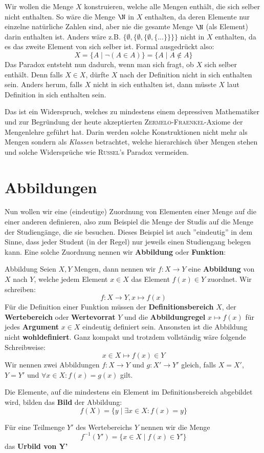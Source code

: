 Wir wollen die Menge $X$ konstruieren, welche alle Mengen enthält, die sich selber nicht enthalten. So wäre die Menge $\N$ in $X$ enthalten, da deren Elemente nur einzelne natürliche Zahlen sind, aber nie die gesamte Menge $\N$ (als Element) darin enthalten ist. Anders wäre z.B. $\{\emptyset, \{\emptyset, \{\emptyset, \{...\}\}\}\}$ nicht in $X$ enthalten, da es das zweite Element von sich selber ist. Formal ausgedrückt also:
$$X = \{ A \mid \neg(A \in A) \} = \{ A \mid A \notin A \}$$
Das Paradox entsteht nun dadurch, wenn man sich fragt, ob $X$ sich selber enthält. Denn falls $X\in X$, dürfte $X$ nach der Definition nicht in sich enthalten sein. Anders herum, falls $X$ nicht in sich enthalten ist, dann müsste $X$ laut Definition in sich enthalten sein.

Das ist ein Widerspruch, welches zu mindestens einem depressiven Mathematiker und zur Begründung der heute akzeptierten \textsc{Zermelo-Fraenkel}-Axiome der Mengenlehre geführt hat. Darin werden solche Konstruktionen nicht mehr als Mengen sondern als \textit{Klassen} betrachtet, welche hierarchisch über Mengen stehen und solche Widersprüche wie \textsc{Russel}'s Paradox vermeiden.

\section{Abbildungen}
Nun wollen wir eine (eindeutige) Zuordnung von Elementen einer Menge auf die einer anderen definieren, also zum Beispiel die Menge der Studis auf die Menge der Studiengänge, die sie besuchen. Dieses Beispiel ist auch ''eindeutig'' in dem Sinne, dass jeder Student (in der Regel) nur jeweils einen Studiengang belegen kann. Eine solche Zuordnung nennen wir \textbf{Abbildung} oder \textbf{Funktion}:

\begin{definition}{Abbildung}{}
Seien $X, Y$ Mengen, dann nennen wir $f: X \to Y$ eine \textbf{Abbildung} von $X$ nach $Y$, welche jedem Element $x \in X$ das Element $f(x) \in Y$ zuordnet. Wir schreiben:
$$f: X\to Y, x\mapsto f(x)$$
Für die Definition einer Funktion müssen der \textbf{Definitionsbereich} $X$, der \textbf{Wertebereich} oder \textbf{Wertevorrat} $Y$ und die \textbf{Abbildungregel} $x \mapsto f(x)$ für jedes \textbf{Argument} $x \in X$ eindeutig definiert sein. Ansonsten ist die Abbildung nicht \textbf{wohldefiniert}. Ganz kompakt und trotzdem vollständig wäre folgende Schreibweise:
$$x \in X \mapsto f(x) \in Y$$
Wir nennen zwei Abbildungen $f: X \to Y$ und $g: X' \to Y'$ gleich, falls $X = X'$, $Y = Y'$ und $\forall x \in X: f(x) = g(x)$ gilt.

Die Elemente, auf die mindestens ein Element im Definitionsbereich abgebildet wird, bilden das \textbf{Bild} der Abbildung:
$$f(X) = \{ y \mid \exists x \in X: f(x) = y\}$$

Für eine Teilmenge $Y'$ des Wertebereichs $Y$ nennen wir die Menge
$$f^{-1}(Y') = \{x \in X \mid f(x) \in Y' \}$$
das \textbf{Urbild von Y'}
\end{definition}

